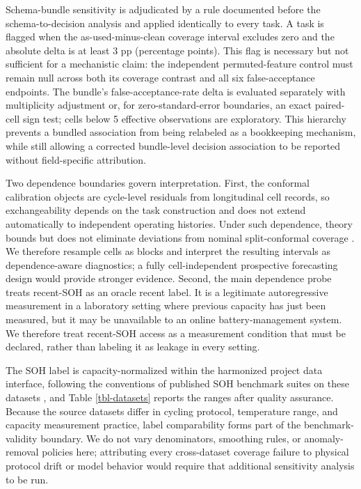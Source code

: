 \documentclass[
  number,
  preprint]{elsarticle}
\begin{document}
Schema-bundle sensitivity is adjudicated by a rule documented before the
schema-to-decision analysis and applied identically to every task. A
task is flagged when the as-used-minus-clean coverage interval excludes
zero and the absolute delta is at least 3 pp (percentage points). This
flag is necessary but not sufficient for a mechanistic claim: the
independent permuted-feature control must remain null across both its
coverage contrast and all six false-acceptance endpoints. The bundle's
false-acceptance-rate delta is evaluated separately with multiplicity
adjustment or, for zero-standard-error boundaries, an exact paired-cell
sign test; cells below 5 effective observations are exploratory. This
hierarchy prevents a bundled association from being relabeled as a
bookkeeping mechanism, while still allowing a corrected bundle-level
decision association to be reported without field-specific attribution.

Two dependence boundaries govern interpretation. First, the conformal
calibration objects are cycle-level residuals from longitudinal cell
records, so exchangeability depends on the task construction and does
not extend automatically to independent operating histories. Under such
dependence, theory bounds but does not eliminate deviations from nominal
split-conformal coverage \citep{oliveira2024split, xu2023conformal}. We
therefore resample cells as blocks and interpret the resulting intervals
as dependence-aware diagnostics; a fully cell-independent prospective
forecasting design would provide stronger evidence. Second, the main
dependence probe treats recent-SOH as an oracle recent label. It is a
legitimate autoregressive measurement in a laboratory setting where
previous capacity has just been measured, but it may be unavailable to
an online battery-management system. We therefore treat recent-SOH
access as a measurement condition that must be declared, rather than
labeling it as leakage in every setting.

The SOH label is capacity-normalized within the harmonized project data
interface, following the conventions of published SOH benchmark suites
on these datasets \citep{wang2024open, zhang2024reliability}, and Table
\ref{tbl-datasets} reports the ranges after quality assurance. Because
the source datasets differ in cycling protocol, temperature range, and
capacity measurement practice, label comparability forms part of the
benchmark-validity boundary. We do not vary denominators, smoothing
rules, or anomaly-removal policies here; attributing every cross-dataset
coverage failure to physical protocol drift or model behavior would
require that additional sensitivity analysis to be run.
\end{document}
